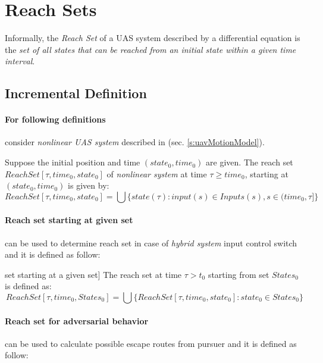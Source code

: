 \section{Reach Sets}\label{s:ReachSets}
    \noindent Informally, the \emph{Reach Set} of a UAS system described by a differential equation is the \emph{set of all states that can be reached from an initial state within a given time interval}.

\subsection{Incremental Definition}\label{sec:reachSetIncrementalDefinition}
    \paragraph{For following definitions} consider \emph{nonlinear UAS system} described in (sec. \ref{s:uavMotionModel}).
    
    \begin{definition}\label{def:reachset01}
        Suppose the initial position
        and time $(state_0, time_0)$ are given. The reach set $ReachSet[\tau, time_0, state_0]$ of \emph{nonlinear system} at time $\tau \ge time_0$, starting at $(state_0, time_0)$ is given by:
        \begin{equation}
            ReachSet[\tau, time_0, state_0] = \bigcup \{state(\tau):input(s)\in Inputs(s),s \in (time_0,\tau]\}
        \end{equation}
    \end{definition}
    
    \paragraph{Reach set starting at given set} can be used to determine reach set in case of \emph{hybrid system} input control switch and it is defined as follow:
    \begin{definition}\label{def:ReachSetBasic} set starting at a given set]
        The reach set at time $\tau > t_0$ starting from set $States_0$ is defined as:
        \begin{equation}
            ReachSet[\tau, time_0, States_0] = \bigcup \{ReachSet[\tau, time_0, state_0]: state_0 \in States_0\}
        \end{equation}
    \end{definition}

    \paragraph{Reach set for adversarial behavior} can be used to calculate possible escape routes from pursuer and it is defined as follow:

